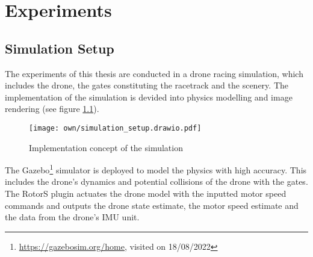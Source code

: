 \chapter{Experiments}
\label{maintwo}

\section{Simulation Setup}
The experiments of this thesis 
are conducted in a drone racing simulation,
which includes the drone,
the gates constituting the racetrack
and the scenery.
The implementation of the simulation
is devided into physics modelling and image rendering
(see figure \ref{fig:simulation_setup}).
\begin{figure}[h]
    \centering
    \texttt{[image: own/simulation\_setup.drawio.pdf]}
    \caption[
        Implementation concept of the simulation
    ]{
        Implementation concept of the simulation
    \label{fig:simulation_setup}
    }
\end{figure}

The Gazebo\footnote{
    \url{https://gazebosim.org/home}, visited on 18/08/2022
} 
simulator is deployed to model the physics with high accuracy.
This includes the drone's dynamics and
potential collisions of the drone with the gates.
The RotorS \cite{Furrer2016} plugin
actuates the drone model with the inputted motor speed commands
and outputs the drone state estimate, the motor speed estimate and the data 
from the drone's IMU unit.

